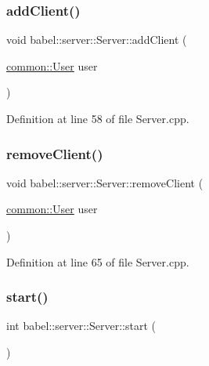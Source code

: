 \subsubsection{\texorpdfstring{add\+Client()}{addClient()}}
{\footnotesize\ttfamily void babel\+::server\+::\+Server\+::add\+Client (\begin{DoxyParamCaption}\item[{\mbox{\hyperlink{classbabel_1_1common_1_1_user}{common\+::\+User}}}]{user }\end{DoxyParamCaption})}



Definition at line 58 of file Server.\+cpp.

\mbox{\label{classbabel_1_1server_1_1_server_a922c6d3e23b961fc2453d78210fc946a}} 
\subsubsection{\texorpdfstring{remove\+Client()}{removeClient()}}
{\footnotesize\ttfamily void babel\+::server\+::\+Server\+::remove\+Client (\begin{DoxyParamCaption}\item[{\mbox{\hyperlink{classbabel_1_1common_1_1_user}{common\+::\+User}}}]{user }\end{DoxyParamCaption})}



Definition at line 65 of file Server.\+cpp.

\mbox{\label{classbabel_1_1server_1_1_server_aa050ebb98ff73cb5be7c6c6854363f18}} 
\subsubsection{\texorpdfstring{start()}{start()}}
{\footnotesize\ttfamily int babel\+::server\+::\+Server\+::start (\begin{DoxyParamCaption}{ }\end{DoxyParamCaption})}



